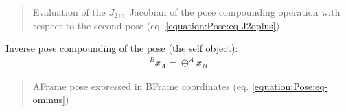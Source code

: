 \documentclass[letterpaper,10pt,english]{sphinxmanual}
\begin{document}
\begin{fulllineitems}
\begin{fulllineitems}
\sphinxAtStartPar
{}
\begin{quote}\begin{description}
\sphinxAtStartPar
Evaluation of the \(J_{2\oplus}\) Jacobian of the pose compounding operation with respect to the second pose (eq. \eqref{equation:Pose:eq-J2oplus})

\end{description}\end{quote}

\end{fulllineitems}


\begin{fulllineitems}
\label{\detokenize{Pose:Pose.Pose.ominus}}
\pysigstartsignatures
{}
\pysigstopsignatures
\sphinxAtStartPar
Inverse pose compounding of the  pose (the self object):
\begin{equation}\label{equation:Pose:eq-ominus}
\begin{split}^Bx_A = \ominus ^Ax_B\end{split}
\end{equation}
\sphinxAtStartPar
{}
\begin{quote}\begin{description}
\sphinxAtStartPar
A\sphinxhyphen{}Frame pose expressed in B\sphinxhyphen{}Frame coordinates (eq. \eqref{equation:Pose:eq-ominus})

\end{description}\end{quote}

\end{fulllineitems}



\end{fulllineitems}
\end{document}
